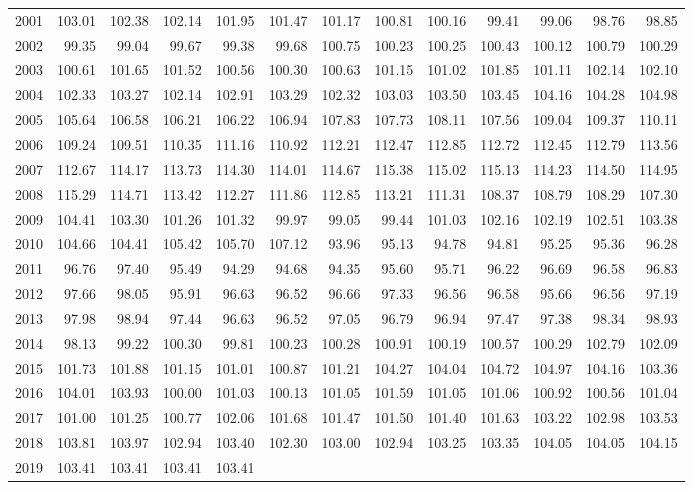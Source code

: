 \begin{longtable}{rrrrrrrrrrrrr}
  2001 & 103.01 & 102.38 & 102.14 & 101.95 & 101.47 & 101.17 & 100.81 & 100.16 & 99.41 & 99.06 & 98.76 & 98.85 \\ 
  2002 & 99.35 & 99.04 & 99.67 & 99.38 & 99.68 & 100.75 & 100.23 & 100.25 & 100.43 & 100.12 & 100.79 & 100.29 \\ 
  2003 & 100.61 & 101.65 & 101.52 & 100.56 & 100.30 & 100.63 & 101.15 & 101.02 & 101.85 & 101.11 & 102.14 & 102.10 \\ 
  2004 & 102.33 & 103.27 & 102.14 & 102.91 & 103.29 & 102.32 & 103.03 & 103.50 & 103.45 & 104.16 & 104.28 & 104.98 \\ 
  2005 & 105.64 & 106.58 & 106.21 & 106.22 & 106.94 & 107.83 & 107.73 & 108.11 & 107.56 & 109.04 & 109.37 & 110.11 \\ 
  2006 & 109.24 & 109.51 & 110.35 & 111.16 & 110.92 & 112.21 & 112.47 & 112.85 & 112.72 & 112.45 & 112.79 & 113.56 \\ 
  2007 & 112.67 & 114.17 & 113.73 & 114.30 & 114.01 & 114.67 & 115.38 & 115.02 & 115.13 & 114.23 & 114.50 & 114.95 \\ 
  2008 & 115.29 & 114.71 & 113.42 & 112.27 & 111.86 & 112.85 & 113.21 & 111.31 & 108.37 & 108.79 & 108.29 & 107.30 \\ 
  2009 & 104.41 & 103.30 & 101.26 & 101.32 & 99.97 & 99.05 & 99.44 & 101.03 & 102.16 & 102.19 & 102.51 & 103.38 \\ 
  2010 & 104.66 & 104.41 & 105.42 & 105.70 & 107.12 & 93.96 & 95.13 & 94.78 & 94.81 & 95.25 & 95.36 & 96.28 \\ 
  2011 & 96.76 & 97.40 & 95.49 & 94.29 & 94.68 & 94.35 & 95.60 & 95.71 & 96.22 & 96.69 & 96.58 & 96.83 \\ 
  2012 & 97.66 & 98.05 & 95.91 & 96.63 & 96.52 & 96.66 & 97.33 & 96.56 & 96.58 & 95.66 & 96.56 & 97.19 \\ 
  2013 & 97.98 & 98.94 & 97.44 & 96.63 & 96.52 & 97.05 & 96.79 & 96.94 & 97.47 & 97.38 & 98.34 & 98.93 \\ 
  2014 & 98.13 & 99.22 & 100.30 & 99.81 & 100.23 & 100.28 & 100.91 & 100.19 & 100.57 & 100.29 & 102.79 & 102.09 \\ 
  2015 & 101.73 & 101.88 & 101.15 & 101.01 & 100.87 & 101.21 & 104.27 & 104.04 & 104.72 & 104.97 & 104.16 & 103.36 \\ 
  2016 & 104.01 & 103.93 & 100.00 & 101.03 & 100.13 & 101.05 & 101.59 & 101.05 & 101.06 & 100.92 & 100.56 & 101.04 \\ 
  2017 & 101.00 & 101.25 & 100.77 & 102.06 & 101.68 & 101.47 & 101.50 & 101.40 & 101.63 & 103.22 & 102.98 & 103.53 \\ 
  2018 & 103.81 & 103.97 & 102.94 & 103.40 & 102.30 & 103.00 & 102.94 & 103.25 & 103.35 & 104.05 & 104.05 & 104.15 \\ 
  2019 & 103.41 & 103.41 & 103.41 & 103.41 &  &  &  &  &  &  &  &  \\ 
   \hline
\hline
\end{longtable}
